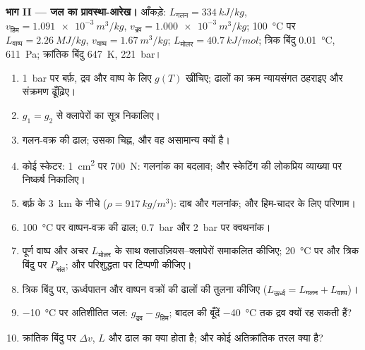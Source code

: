 \begin{problem}
\textbf{भाग II --- जल का प्रावस्था-आरेख।}
आँकड़े: $L_{\text{गलन}} = \qty{334}{kJ/kg}$, $v_{\text{हिम}} = \qty{1.091e-3}{m^3/kg}$,
$v_{\text{द्रव}} = \qty{1.000e-3}{m^3/kg}$; \qty{100}{\celsius} पर $L_{\text{वाष्प}} = \qty{2.26}{MJ/kg}$,
$v_{\text{वाष्प}} = \qty{1.67}{m^3/kg}$; $L_{\text{मोलर}} = \qty{40.7}{kJ/mol}$;
त्रिक बिंदु \qty{0.01}{\celsius}, \qty{611}{Pa}; क्रांतिक बिंदु \qty{647}{K},
\qty{221}{bar}।
\begin{enumerate}[resume]
  \item \qty{1}{bar} पर बर्फ़, द्रव और वाष्प के लिए $g(T)$ खींचिए; ढालों
        का क्रम न्यायसंगत ठहराइए और संक्रमण ढूँढ़िए।
  \item $g_1 = g_2$ से क्लापेरों का सूत्र निकालिए।
  \item गलन-वक्र की ढाल; उसका चिह्न, और वह असामान्य क्यों है।
  \item कोई स्केटर: \qty{1}{cm^2} पर \qty{700}{N}: गलनांक का
        बदलाव; और स्केटिंग की लोकप्रिय व्याख्या पर निष्कर्ष निकालिए।
  \item बर्फ़ के \qty{3}{km} के नीचे ($\rho = \qty{917}{kg/m^3}$): दाब और
        गलनांक; और हिम-चादर के लिए परिणाम।
  \item \qty{100}{\celsius} पर वाष्पन-वक्र की ढाल; \qty{0.7}{bar} और
        \qty{2}{bar} पर क्वथनांक।
  \item पूर्ण वाष्प और अचर $L_{\text{मोलर}}$ के साथ क्लाउज़ियस--क्लापेरों
        समाकलित कीजिए; \qty{20}{\celsius} पर और त्रिक बिंदु पर
        $P_{\text{संत}}$; और परिशुद्धता पर टिप्पणी कीजिए।
  \item त्रिक बिंदु पर, ऊर्ध्वपातन और वाष्पन वक्रों की ढालों की
        तुलना कीजिए ($L_{\text{ऊर्ध्व}} = L_{\text{गलन}} + L_{\text{वाष्प}}$)।
  \item \qty{-10}{\celsius} पर अतिशीतित जल: $g_{\text{द्रव}} - g_{\text{हिम}}$;
        बादल की बूँदें \qty{-40}{\celsius} तक द्रव क्यों रह सकती हैं?
  \item क्रांतिक बिंदु पर $\Delta v$, $L$ और ढाल का क्या होता है; और
        कोई अतिक्रांतिक तरल क्या है?
\end{enumerate}


\end{problem}
